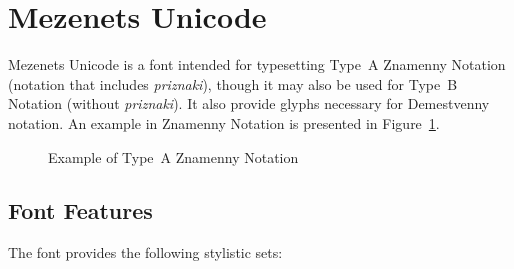 \documentclass[11pt]{article}
\begin{document}
\section{Mezenets Unicode}

Mezenets Unicode is a font intended for typesetting Type~A Znamenny Notation (notation
that includes \emph{priznaki}), though it may also be used for Type~B Notation (without
\emph{priznaki}). It also provide glyphs necessary for Demestvenny notation. An example in
Znamenny Notation is presented in Figure~\ref{mezenets}.

\begin{figure}[tbp]
\begin{churchslavonic}
\noindent
{}
\end{churchslavonic}
\caption{Example of Type~A Znamenny Notation \label{mezenets}}
\end{figure}

\subsection{Font Features}

The font provides the following stylistic sets:
\end{document}
